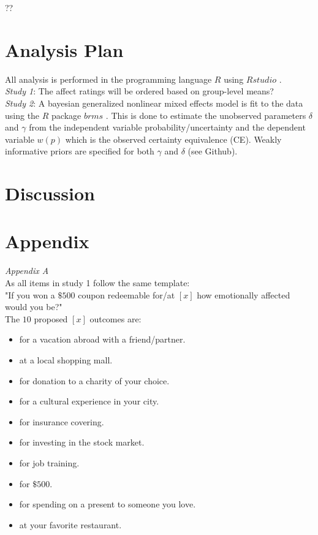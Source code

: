 \documentclass[12pt]{article}
\begin{document}
??

\section{Analysis Plan}

All analysis is performed in the programming
language $R$ \autocite{rcore} using $Rstudio$
\autocite{rstudio}. \\

\emph{Study 1}: The affect ratings will be
ordered based on group-level means? \\

\emph{Study 2}: A bayesian generalized nonlinear
mixed effects model is fit to the data using the
$R$ package $brms$ \autocite{brms}.
This is done to estimate the unobserved parameters
$\delta$ and $\gamma$ from the independent variable
probability/uncertainty and the dependent variable
$w(p)$ which is the observed certainty equivalence (CE).
Weakly informative priors are specified for both
$\gamma$ and $\delta$ (see Github).


\section{Discussion}

\printbibliography

\section{Appendix}

\emph{Appendix A} \\
As all items in study 1 follow the same template: \\

"If you won a $\$500$ coupon redeemable for/at
$[x]$ how emotionally affected would you be?" \\

The $10$ proposed $[x]$ outcomes are:
\begin{itemize}
	\item for a vacation abroad with a friend/partner.
	\item at a local shopping mall.
	\item for donation to a charity of your choice.
	\item for a cultural experience in your city.
	\item for insurance covering.
	\item for investing in the stock market.
	\item for job training.
	\item for $\$500$.
	\item for spending on a present to someone you love.
	\item at your favorite restaurant.
\end{itemize}
\end{document}
